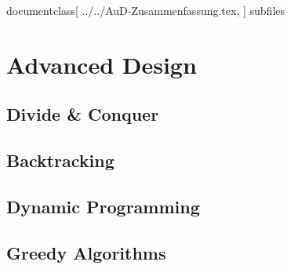 documentclass[
../../AuD-Zusammenfassung.tex,
]
{subfiles}


\graphicspath{{../../}}


\section{Advanced Design}
\subsection{Divide & Conquer}


\newpage
\subsection{Backtracking}


\newpage
\subsection{Dynamic Programming}


\newpage
\subsection{Greedy Algorithms}

